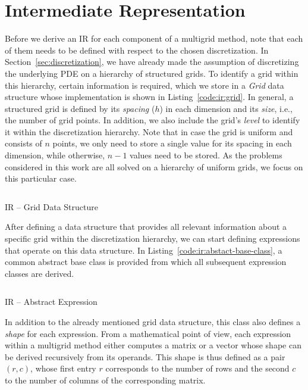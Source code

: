 \section{Intermediate Representation}
\label{sec:intermediate-representation}
Before we derive an IR for each component of a multigrid method, note that each of them needs to be defined with respect to the chosen discretization.
In Section~\ref{sec:discretization}, we have already made the assumption of discretizing the underlying PDE on a hierarchy of structured grids.
To identify a grid within this hierarchy, certain information is required, which we store in a \emph{Grid} data structure whose implementation is shown in Listing~\ref{code:ir:grid}.
In general, a structured grid is defined by its \emph{spacing} ($h$) in each dimension and its \emph{size}, i.e., the number of grid points.
In addition, we also include the grid's \emph{level} to identify it within the discretization hierarchy.
Note that in case the grid is uniform and consists of $n$ points, we only need to store a single value for its spacing in each dimension, while otherwise, $n-1$ values need to be stored.
As the problems considered in this work are all solved on a hierarchy of uniform grids, we focus on this particular case.
\begin{listing}
	\inputminted{python}{evostencils/ir/grid.py}
	\caption{IR -- Grid Data Structure}
	\label{code:ir:grid}
\end{listing}
After defining a data structure that provides all relevant information about a specific grid within the discretization hierarchy, we can start defining expressions that operate on this data structure.
In Listing~\ref{code:ir:abstact-base-class}, a common abstract base class is provided from which all subsequent expression classes are derived.
\begin{listing}
	\inputminted{python}{evostencils/ir/expression.py}
	\caption{IR -- Abstract Expression}
	\label{code:ir:abstact-base-class}
\end{listing}
In addition to the already mentioned grid data structure, this class also defines a \emph{shape} for each expression.
From a mathematical point of view, each expression within a multigrid method either computes a matrix or a vector whose shape can be derived recursively from its operands.
This shape is thus defined as a pair $(r, c)$, whose first entry $r$ corresponds to the number of rows and the second $c$ to the number of columns of the corresponding matrix.
